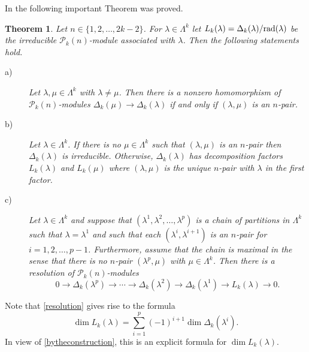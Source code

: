 \documentclass[10pt,hidelinks]{article}
\newcommand{\rad}{{\rm rad} }
\newcommand{\ParAlg}{{\mathcal P }_{k}}
\newtheorem{theorem}{Theorem}
\numberwithin{equation}{section}
\begin{document}
In \cite{PMartin1} the following important Theorem was proved.
\begin{theorem}\label{mainPaul}
  Let $ n \in \{1,2,\ldots, 2k-2 \} $. For $ \lambda \in \Lambda^k $ let $ L_k(\lambda) = \Delta_k(\lambda)/\rad(\lambda) $
be the irreducible $ \ParAlg(n)$-module associated with $ \lambda$. 
Then the following statements hold. 
  \label{importantThmPaul}
  \begin{description}
  \item[a)] Let $ \lambda, \mu \in \Lambda^k $ with $ \lambda \neq \mu$. Then there is a nonzero homomorphism of $ \ParAlg(n)$-modules
    $ \Delta_k(\mu) \rightarrow \Delta_k(\lambda) $ if and only if $ (\lambda, \mu) $ is an $n$-pair. 
  \item[b)] Let $ \lambda \in \Lambda^k$. If there is no $ \mu \in \Lambda^k $ such that $ (\lambda, \mu ) $ is an $n$-pair then
    $ \Delta_k(\lambda) $ is irreducible. Otherwise, $ \Delta_k(\lambda) $ has decomposition factors $ L_k(\lambda) $ and
    $ L_k(\mu) $ where $ (\lambda, \mu ) $ is the unique $n$-pair with $ \lambda $ in the first factor. 
  \item[c)] Let $ \lambda \in \Lambda^k $ and suppose that $ ( \lambda^1, \lambda^2, \ldots, \lambda^p) $
    is a chain of partitions in $ \Lambda^k$ such that $ \lambda= \lambda^1 $ and such that each $ (\lambda^i, \lambda^{i+1}) $ is an $n$-pair
    for $ i =1,2,\ldots, p-1$. Furthermore, assume that the chain is maximal in the sense that there is no $n$-pair $ (\lambda^p, \mu) $
    with $ \mu \in \Lambda^k$. Then there is a resolution of $ \ParAlg(n)$-modules
    \begin{equation}\label{resolution}
      0 \rightarrow \Delta_k(\lambda^p) \rightarrow \cdots \rightarrow \Delta_k(\lambda^2)\rightarrow \Delta_k(\lambda^1 ) \rightarrow L_k(\lambda  )
\rightarrow 0.
    \end{equation}    
  \end{description}
  
\end{theorem}

Note that \eqref{resolution} gives rise to the formula 
\begin{equation}
\dim L_k(\lambda) = \sum_{i=1}^p (-1)^{i+1} \dim \Delta_k(\lambda^i). 
\end{equation}  
In view of \eqref{bytheconstruction}, this is an explicit formula for $ \dim L_k(\lambda) $. 
\end{document}
